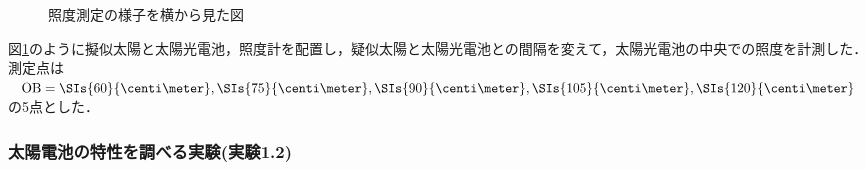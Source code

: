 \documentclass[1_power_supply.tex]{subfiles}
\begin{document}
      \begin{figure}[htbp]
        \begin{center}
          \caption{照度測定の様子を横から見た図}\label{fig:1_1}
        \end{center}
      \end{figure}

      図\ref{fig:1_1}のように擬似太陽と太陽光電池，照度計を配置し，疑似太陽と太陽光電池との間隔を変えて，太陽光電池の中央での照度を計測した．測定点は$\mathrm{OB}=\SIs{60}{\centi\meter},\SIs{75}{\centi\meter},\SIs{90}{\centi\meter},\SIs{105}{\centi\meter},\SIs{120}{\centi\meter}$の5点とした．

    \subsubsection{太陽電池の特性を調べる実験(実験1.2)}
\end{document}
